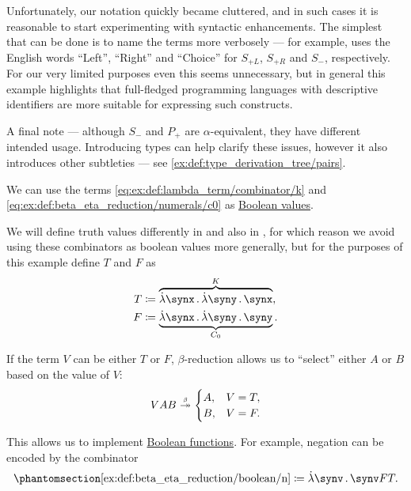 \begin{example}
\begin{thmenum}
    Unfortunately, our notation quickly became cluttered, and in such cases it is reasonable to start experimenting with syntactic enhancements. The simplest that can be done is to name the terms more verbosely --- for example, \cite{MathOF:product_type_in_simply_typed_lambda_terms} uses the English words \enquote{Left}, \enquote{Right} and \enquote{Choice} for \( S_{+L} \), \( S_{+R} \) and \( S_- \), respectively. For our very limited purposes even this seems unnecessary, but in general this example highlights that full-fledged programming languages with descriptive identifiers are more suitable for expressing such constructs.

    A final note --- although \( S_- \) and \( P_+ \) are \( \alpha \)-equivalent, they have different intended usage. Introducing types can help clarify these issues, however it also introduces other subtleties --- see \cref{ex:def:type_derivation_tree/pairs}.

     We can use the terms \ref{eq:ex:def:lambda_term/combinator/k} and \ref{eq:ex:def:beta_eta_reduction/numerals/c0} as \hyperref[con:boolean_value]{Boolean values}.

    We will define truth values differently in  and also in , for which reason we avoid using these combinators as boolean values more generally, but for the purposes of this example define \( T \) and \( F \) as
    \begin{align*}
      T &\coloneqq \overbrace{\qabs \synx \qabs \syny \synx}^K, \\
      F &\coloneqq \underbrace{\qabs \synx \qabs \syny \syny}_{C_0}.
    \end{align*}

    If the term \( V \) can be either \( T \) or \( F \), \( \beta \)-reduction allows us to \enquote{select} either \( A \) or \( B \) based on the value of \( V \):
    \begin{equation}\label{ex:def:beta_eta_reduction/boolean/if}
      VAB \bred* \begin{cases}
        A, &V = T, \\
        B, &V = F.
      \end{cases}
    \end{equation}

    This allows us to implement \hyperref[def:boolean_function]{Boolean functions}. For example, negation can be encoded by the combinator
    \begin{equation*}\taglabel[N]{ex:def:beta_eta_reduction/boolean/n}
      \ref{ex:def:beta_eta_reduction/boolean/n} \coloneqq \qabs \synv \synv F T.
    \end{equation*}


\end{thmenum}
\end{example}

